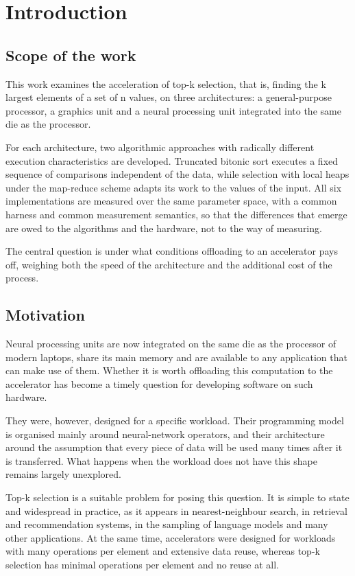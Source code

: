 \chapter{Introduction}
\label{ch:intro}

\section{Scope of the work}
\label{sec:intro-scope}

This work examines the acceleration of top-k selection, that is, finding the k
largest elements of a set of n values, on three architectures: a
general-purpose processor, a graphics unit and a neural processing unit
integrated into the same die as the processor.

For each architecture, two algorithmic approaches with radically different
execution characteristics are developed. Truncated bitonic sort executes a
fixed sequence of comparisons independent of the data, while selection with
local heaps under the map-reduce scheme adapts its work to the values of the
input. All six implementations are measured over the same parameter space, with
a common harness and common measurement semantics, so that the differences that
emerge are owed to the algorithms and the hardware, not to the way of
measuring.

The central question is under what conditions offloading to an accelerator pays
off, weighing both the speed of the architecture and the additional cost of the
process.

\section{Motivation}
\label{sec:intro-motivation}

Neural processing units are now integrated on the same die as the processor of
modern laptops, share its main memory and are available to any application that
can make use of them. Whether it is worth offloading this computation to the
accelerator has become a timely question for developing software on such
hardware.

They were, however, designed for a specific workload. Their programming model
is organised mainly around neural-network operators, and their architecture
around the assumption that every piece of data will be used many times after it
is transferred. What happens when the workload does not have this shape remains
largely unexplored.

Top-k selection is a suitable problem for posing this question. It is simple to
state and widespread in practice, as it appears in nearest-neighbour search, in
retrieval and recommendation systems, in the sampling of language models and
many other applications. At the same time, accelerators were designed for
workloads with many operations per element and extensive data reuse, whereas
top-k selection has minimal operations per element and no reuse at all.

